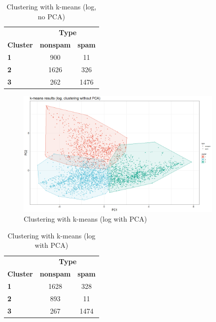 \documentclass{article}
\begin{document}
	\begin{table}[h]
		\centering
		\begin{tabular}{lcc}
			& \multicolumn{2}{c}{\textbf{Type}} \\
			\textbf{Cluster} & \textbf{nonspam} & \textbf{spam} \\
			\textbf{1} & 900 & 11 \\
			\textbf{2} & 1626 & 326 \\
			\textbf{3} & 262 & 1476 \\
		\end{tabular}
		\caption{Clustering with k-means (log, no PCA)}
		\label{tab::clust_kmeans_log}
	\end{table}

	\begin{figure}[h]
		\centering
		\includegraphics[width=0.9\textwidth]{proj2_plots/kmeans_res_log.png}
		\caption{Clustering with k-means (log with PCA)}
		\label{fig::clust_kmeans_log_pca}
	\end{figure}

	\begin{table}[h]
		\centering
		\begin{tabular}{lcc}
			& \multicolumn{2}{c}{\textbf{Type}} \\
			\textbf{Cluster} & \textbf{nonspam} & \textbf{spam} \\
			\textbf{1} & 1628 & 328 \\
			\textbf{2} & 893 & 11 \\
			\textbf{3} & 267 & 1474 \\
		\end{tabular}
		\caption{Clustering with k-means (log with PCA)}
		\label{tab::clust_kmeans_log_pca}
	\end{table}
	
\end{document}
